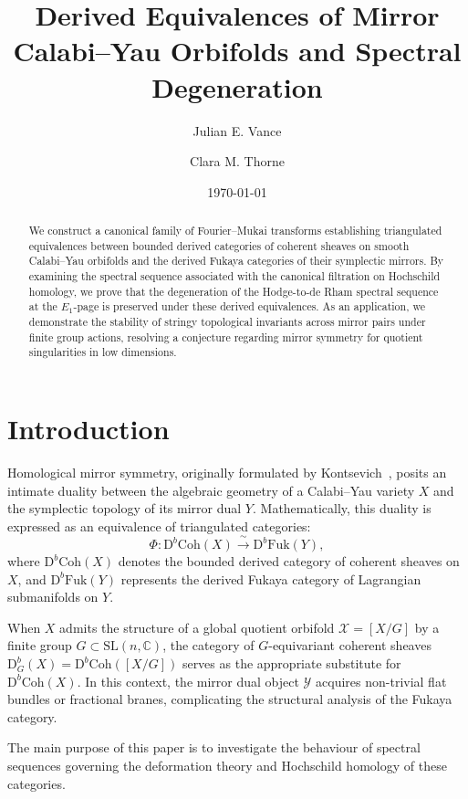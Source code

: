 \documentclass[12pt,reqno]{amsart}
\title[Derived Equivalences of Mirror Calabi--Yau Orbifolds]{Derived Equivalences of Mirror Calabi--Yau Orbifolds and Spectral Degeneration}
\author[J.~E.~Vance]{Julian E. Vance}
\author[C.~M.~Thorne]{Clara M. Thorne}
\date{\today}
\theoremstyle{plain}
\theoremstyle{definition}
\theoremstyle{remark}
\newcommand{\cX}{\mathcal{X}}
\newcommand{\cY}{\mathcal{Y}}
\newcommand{\Db}{\mathrm{D}^b}
\newcommand{\Coh}{\mathrm{Coh}}
\newcommand{\Fuk}{\mathrm{Fuk}}
\newcommand{\CC}{\mathbb{C}}
\numberwithin{equation}{section}
\begin{document}
\begin{abstract}
We construct a canonical family of Fourier--Mukai transforms establishing triangulated equivalences between bounded derived categories of coherent sheaves on smooth Calabi--Yau orbifolds and the derived Fukaya categories of their symplectic mirrors. By examining the spectral sequence associated with the canonical filtration on Hochschild homology, we prove that the degeneration of the Hodge-to-de Rham spectral sequence at the $E_1$-page is preserved under these derived equivalences. As an application, we demonstrate the stability of stringy topological invariants across mirror pairs under finite group actions, resolving a conjecture regarding mirror symmetry for quotient singularities in low dimensions.
\end{abstract}

\maketitle

\section{Introduction}
\label{sec:intro}

Homological mirror symmetry, originally formulated by Kontsevich~\cite{Kontsevich1994}, posits an intimate duality between the algebraic geometry of a Calabi--Yau variety $X$ and the symplectic topology of its mirror dual $Y$. Mathematically, this duality is expressed as an equivalence of triangulated categories:
\begin{equation}
\label{eq:hms-equivalence}
\Phi \colon \Db\Coh(X) \xrightarrow{\;\sim\;} \Db\Fuk(Y),
\end{equation}
where $\Db\Coh(X)$ denotes the bounded derived category of coherent sheaves on $X$, and $\Db\Fuk(Y)$ represents the derived Fukaya category of Lagrangian submanifolds on $Y$.

When $X$ admits the structure of a global quotient orbifold $\cX = [X/G]$ by a finite group $G \subset \mathrm{SL}(n, \CC)$, the category of $G$-equivariant coherent sheaves $\Db_G(X) = \Db\Coh([X/G])$ serves as the appropriate substitute for $\Db\Coh(X)$. In this context, the mirror dual object $\cY$ acquires non-trivial flat bundles or fractional branes, complicating the structural analysis of the Fukaya category.

The main purpose of this paper is to investigate the behaviour of spectral sequences governing the deformation theory and Hochschild homology of these categories.
\end{document}

